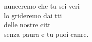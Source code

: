 \begin{cancion}[Annuncieremo][]%
	nunceremo che tu sei veri\\
	lo grideremo dai tti \\
	delle nostre citt \\
	senza paura e tu  puoi canre.\\
\end{cancion}%
